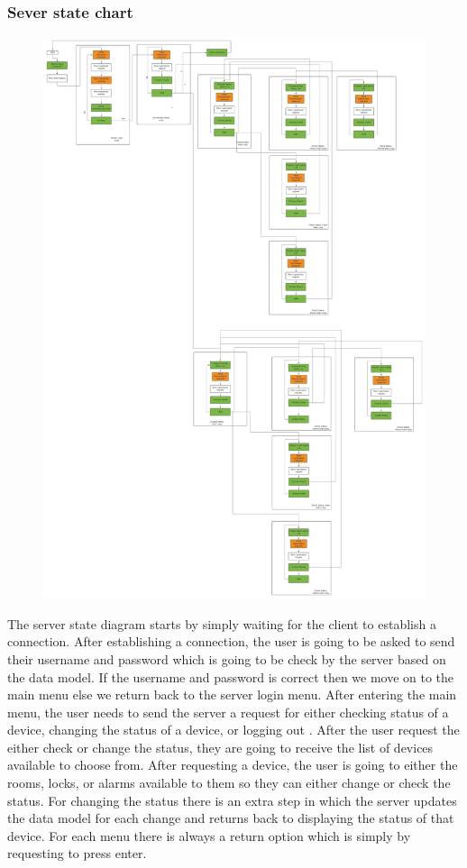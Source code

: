 \documentclass[11pt]{article}
\begin{document}
			\subsubsection{Sever state chart}
				\begin{figure}[H]
					\centering
					\includegraphics[scale=0.5]{server_state_diagram}
					\label{fig:serverstatediagram}
				\end{figure}
				The server state diagram starts by simply waiting for the client to establish a connection. After establishing a connection, the user is going to be asked to send their username and password which is going to be check by the server based on the data model. If the username and password is correct then we move on to the main menu else we return back to the server login menu. After entering the main menu, the user needs to send the server a request for either checking status of a device, changing the status of a device, or logging out . After the user request the either check or change the status, they are going to receive the list of devices available to choose from. After requesting a device, the user is going to either the rooms, locks, or alarms available to them so they can either change or check the status. For changing the status there is an extra step in which the server updates the data model for each change and returns back to displaying the status of that device. For each menu there is always a return option which is simply by requesting to press enter. 
\end{document}
